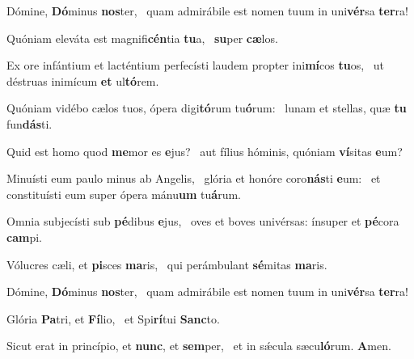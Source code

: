 \item Dómine, \textbf{Dó}minus \textbf{nos}ter,~\psstar{} quam admirábile est nomen tuum in uni\textbf{vér}sa \textbf{ter}ra!
\item Quóniam eleváta est magnifi\textbf{cén}tia \textbf{tu}a,~\psstar{} \textbf{su}per \textbf{cæ}los.
\item Ex ore infántium et lacténtium perfecísti laudem propter ini\textbf{mí}cos \textbf{tu}os,~\psstar{} ut déstruas inimícum \textbf{et} ul\textbf{tó}rem.
\item Quóniam vidébo cælos tuos, ópera digi\textbf{tó}rum tu\textbf{ó}rum:~\psstar{} lunam et stellas, quæ \textbf{tu} fun\textbf{dás}ti.
\item Quid est homo quod \textbf{me}mor es \textbf{e}jus?~\psstar{} aut fílius hóminis, quóniam \textbf{ví}sitas \textbf{e}um?
\item Minuísti eum paulo minus ab Angelis,~\pscross{} glória et honóre coro\textbf{nás}ti \textbf{e}um:~\psstar{} et constituísti eum super ópera mánu\textbf{um} tu\textbf{á}rum.
\item Omnia subjecísti sub \textbf{pé}dibus \textbf{e}jus,~\psstar{} oves et boves univérsas: ínsuper et \textbf{pé}cora \textbf{cam}pi.
\item Vólucres cæli, et \textbf{pi}sces \textbf{ma}ris,~\psstar{} qui perámbulant \textbf{sé}mitas \textbf{ma}ris.
\item Dómine, \textbf{Dó}minus \textbf{nos}ter,~\psstar{} quam admirábile est nomen tuum in uni\textbf{vér}sa \textbf{ter}ra!
\item Glória \textbf{Pa}tri, et \textbf{Fí}lio,~\psstar{} et Spi\textbf{rí}tui \textbf{Sanc}to.
\item Sicut erat in princípio, et \textbf{nunc}, et \textbf{sem}per,~\psstar{} et in sǽcula sæcu\textbf{ló}rum. \textbf{A}men.
